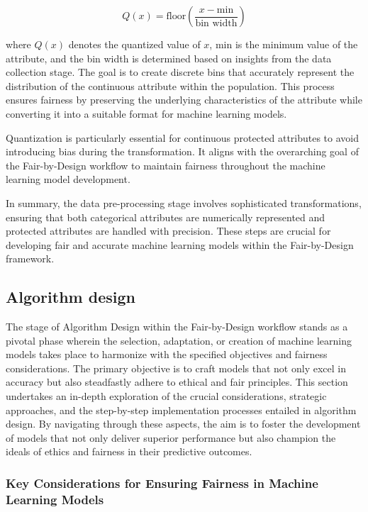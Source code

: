 \[ Q(x) = \text{{floor}}\left(\frac{{x - \text{{min}}}}{{\text{{bin width}}}}\right) \]

where \( Q(x) \) denotes the quantized value of \( x \), \(\text{{min}}\) is the minimum value of the attribute, and the bin width is determined based on insights from the data collection stage. The goal is to create discrete bins that accurately represent the distribution of the continuous attribute within the population. This process ensures fairness by preserving the underlying characteristics of the attribute while converting it into a suitable format for machine learning models.

Quantization is particularly essential for continuous protected attributes to avoid introducing bias during the transformation. It aligns with the overarching goal of the Fair-by-Design workflow to maintain fairness throughout the machine learning model development.

In summary, the data pre-processing stage involves sophisticated transformations, ensuring that both categorical attributes are numerically represented and protected attributes are handled with precision. These steps are crucial for developing fair and accurate machine learning models within the Fair-by-Design framework.

\subsection{Algorithm design}
\label{subsection:algorithm}

The stage of Algorithm Design within the Fair-by-Design workflow stands as a pivotal phase wherein the selection, adaptation, or creation of machine learning models takes place to harmonize with the specified objectives and fairness considerations. The primary objective is to craft models that not only excel in accuracy but also steadfastly adhere to ethical and fair principles. This section undertakes an in-depth exploration of the crucial considerations, strategic approaches, and the step-by-step implementation processes entailed in algorithm design. By navigating through these aspects, the aim is to foster the development of models that not only deliver superior performance but also champion the ideals of ethics and fairness in their predictive outcomes.

\subsubsection{Key Considerations for Ensuring Fairness in Machine Learning Models}

